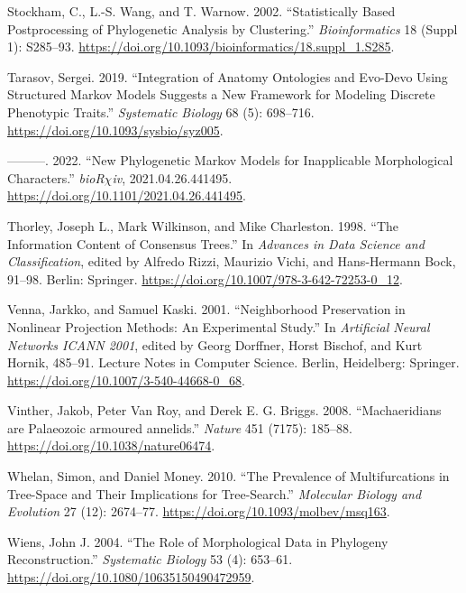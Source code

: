 \begin{CSLReferences}{1}{0}
\leavevmode{}%
Stockham, C., L.-S. Wang, and T. Warnow. 2002. {``Statistically Based Postprocessing of Phylogenetic Analysis by Clustering.''} \emph{Bioinformatics} 18 (Suppl 1): S285--93. \url{https://doi.org/10.1093/bioinformatics/18.suppl_1.S285}.

\leavevmode{}%
Tarasov, Sergei. 2019. {``Integration of Anatomy Ontologies and Evo-Devo Using Structured {Markov} Models Suggests a New Framework for Modeling Discrete Phenotypic Traits.''} \emph{Systematic Biology} 68 (5): 698--716. \url{https://doi.org/10.1093/sysbio/syz005}.

\leavevmode{}%
---------. 2022. {``New Phylogenetic {Markov} Models for Inapplicable Morphological Characters.''} \emph{bioR{\(\chi\)}iv}, 2021.04.26.441495. \url{https://doi.org/10.1101/2021.04.26.441495}.

\leavevmode{}%
Thorley, Joseph L., Mark Wilkinson, and Mike Charleston. 1998. {``The Information Content of Consensus Trees.''} In \emph{Advances in {Data Science} and {Classification}}, edited by Alfredo Rizzi, Maurizio Vichi, and Hans-Hermann Bock, 91--98. {Berlin}: {Springer}. \url{https://doi.org/10.1007/978-3-642-72253-0_12}.

\leavevmode{}%
Venna, Jarkko, and Samuel Kaski. 2001. {``Neighborhood Preservation in Nonlinear Projection Methods: An Experimental Study.''} In \emph{Artificial {Neural Networks} \textemdash{} {ICANN} 2001}, edited by Georg Dorffner, Horst Bischof, and Kurt Hornik, 485--91. Lecture {Notes} in {Computer Science}. {Berlin, Heidelberg}: {Springer}. \url{https://doi.org/10.1007/3-540-44668-0_68}.

\leavevmode{}%
Vinther, Jakob, Peter Van Roy, and Derek E. G. Briggs. 2008. {``{Machaeridians are Palaeozoic armoured annelids}.''} \emph{Nature} 451 (7175): 185--88. \url{https://doi.org/10.1038/nature06474}.

\leavevmode{}%
Whelan, Simon, and Daniel Money. 2010. {``The Prevalence of Multifurcations in Tree-Space and Their Implications for Tree-Search.''} \emph{Molecular Biology and Evolution} 27 (12): 2674--77. \url{https://doi.org/10.1093/molbev/msq163}.

\leavevmode{}%
Wiens, John J. 2004. {``The Role of Morphological Data in Phylogeny Reconstruction.''} \emph{Systematic Biology} 53 (4): 653--61. \url{https://doi.org/10.1080/10635150490472959}.


\end{CSLReferences}

